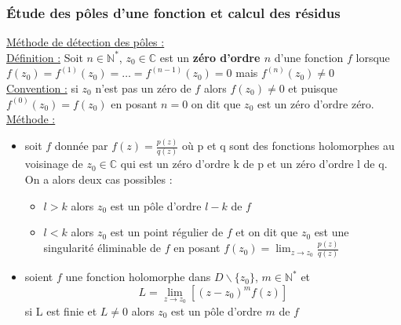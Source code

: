 \documentclass[../main.tex]{subfiles}
\begin{document}
\subsubsection{Étude des pôles d'une fonction et calcul des résidus}
\quad \underline{Méthode de détection des pôles :}\\
\underline{Définition :} Soit $n \in \mathbb{N}^*$, $z_0 \in \mathbb{C}$ est un \textbf{zéro d'ordre $n$} d'une fonction $f$ lorsque $f(z_0) = f^{(1)}(z_0) = \dots = f^{(n-1)}(z_0) = 0$ mais $f^{(n)}(z_0)\neq 0$\\
\color{gray}\underline{Convention :} si $z_0$ n'est pas un zéro de $f$ alors $f(z_0) \neq 0$ et puisque $f^{(0)}(z_0) = f(z_0)$ en posant $n=0$ on dit que $z_0$ est un zéro d'ordre zéro.\color{black}\\

\quad \underline{Méthode :} \begin{itemize}
    \item soit $f$ donnée par $f(z) = \frac{p(z)}{q(z)}$ où p et q sont des fonctions holomorphes au voisinage de $z_0 \in \mathbb{C}$ qui est un zéro d'ordre k de p et un zéro d'ordre l de q. On a alors deux cas possibles :\begin{itemize}
        \item $l>k$ alors $z_0$ est un pôle d'ordre $l-k$ de $f$\\
        \item $l<k$ alors $z_0$ est un point régulier de $f$ et on dit que $z_0$ est une singularité éliminable de $f$ en posant $f(z_0) = \lim_{z\rightarrow z_0} \frac{p(z)}{q(z)}$\\
    \end{itemize}
    \item soient $f$ une fonction holomorphe dans $D\backslash \{z_0\}$, $m\in \mathbb{N}^*$ et \begin{equation}
        L = \lim_{z\rightarrow z_0} [(z-z_0)^m f(z)]
    \end{equation}
    si L est finie et $L\neq 0$ alors $z_0$ est un pôle d'ordre $m$ de $f$\\
\end{itemize}
\end{document}
